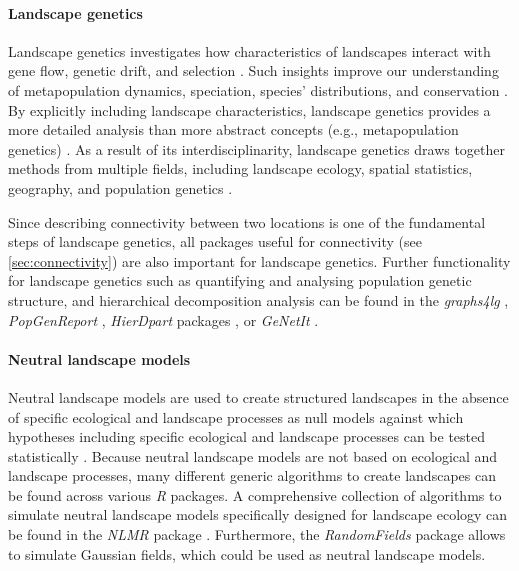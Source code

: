 \documentclass[smallextended]{svjour3}       %
\begin{document}
\hypertarget{sec:landscape_genetics}{%
\paragraph{Landscape genetics}\label{sec:landscape_genetics}}

Landscape genetics investigates how characteristics of landscapes interact with gene flow, genetic drift, and selection \cite{Manel2003}.
Such insights improve our understanding of metapopulation dynamics, speciation, species' distributions, and conservation \cite{Storfer2007}.
By explicitly including landscape characteristics, landscape genetics provides a more detailed analysis than more abstract concepts (e.g., metapopulation genetics) \cite{Holderegger2006}.
As a result of its interdisciplinarity, landscape genetics draws together methods from multiple fields, including landscape ecology, spatial statistics, geography, and population genetics \cite{Storfer2007}.

Since describing connectivity between two locations is one of the fundamental steps of landscape genetics, all packages useful for connectivity (see \ref{sec:connectivity}) are also important for landscape genetics.
Further functionality for landscape genetics such as quantifying and analysing population genetic structure, and hierarchical decomposition analysis can be found in the \emph{graphs4lg} \cite{Savary2020}, \emph{PopGenReport} \cite{Adamack2014,Gruber2015}, \emph{HierDpart} packages \cite{Qin2019}, or \emph{GeNetIt} \cite{Murphy2010}.

\hypertarget{sec:NLM}{%
\paragraph{Neutral landscape models}\label{sec:NLM}}

Neutral landscape models are used to create structured landscapes in the absence of specific ecological and landscape processes as null models against which hypotheses including specific ecological and landscape processes can be tested statistically \cite{Gardner1987,With1997}.
Because neutral landscape models are not based on ecological and landscape processes, many different generic algorithms to create landscapes can be found across various \emph{R} packages.
A comprehensive collection of algorithms to simulate neutral landscape models specifically designed for landscape ecology can be found in the \emph{NLMR} package \cite{Sciaini2018}.
Furthermore, the \emph{RandomFields} package \cite{Schlather2015} allows to simulate Gaussian fields, which could be used as neutral landscape models.
\end{document}
